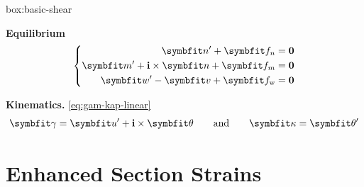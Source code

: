 \begin{ambox}{box:basic-shear}

\textbf{Equilibrium}
\begin{equation}
\left\{
    \begin{aligned}
        \bm{n}' +\bm{f}_n &=  \mathbf{0} \\
        \bm{m}' + \FrameBasis \times \bm{n} + \bm{f}_m &= \mathbf{0} \\
        \bm{w}' - \bm{v} + \bm{f}_{\rm w} &= \mathbf{0}
    \end{aligned}
\right.
\end{equation}

\textbf{Kinematics.} \eqref{eq:gam-kap-linear}
$$
\begin{aligned}
\ShearStrain = \bm{u}^{\prime}+\FrameBasis  \times \bm{\theta} 
\qquad\text{and}\qquad
\CurveStrain = \bm{\theta}^{\prime}
\end{aligned}
$$

\end{ambox}


\section{Enhanced Section Strains}\label{sec:enhan-section}

